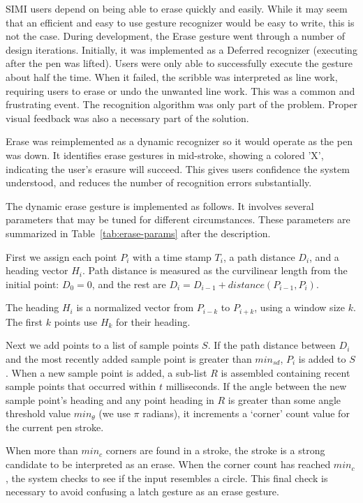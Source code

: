 

SIMI users depend on being able to erase quickly and easily. While it
may seem that an efficient and easy to use gesture recognizer would be
easy to write, this is not the case. During development, the Erase
gesture went through a number of design iterations. Initially, it was
implemented as a Deferred recognizer (executing after the pen was
lifted). Users were only able to successfully execute the gesture
about half the time. When it failed, the scribble was interpreted as
line work, requiring users to erase or undo the unwanted line work. This
was a common and frustrating event. The recognition algorithm was only
part of the problem. Proper visual feedback was also a necessary part
of the solution.

Erase was reimplemented as a dynamic recognizer so it would operate as
the pen was down. It identifies erase gestures in mid-stroke, showing
a colored 'X', indicating the user's erasure will succeed. This gives
users confidence the system understood, and reduces the number of
recognition errors substantially.

The dynamic erase gesture is implemented as follows. It involves
several parameters that may be tuned for different
circumstances. These parameters are summarized in
Table~\ref{tab:erase-params} after the description.

First we assign each point $P_i$ with a time stamp $T_i$, a path
distance $D_i$, and a heading vector $H_i$. Path distance is measured
as the curvilinear length from the initial point: $D_0=0$, and the
rest are $D_i = D_{i-1} + distance(P_{i-1}, P_i)$.

The heading $H_i$ is a normalized vector from $P_{i-k}$ to $P_{i+k}$,
using a window size $k$. The first $k$ points use $H_k$ for their
heading.

Next we add points to a list of sample points $S$. If the path
distance between $D_i$ and the most recently added sample point is
greater than $min_{sd}$, $P_i$ is added to $S$. When a new sample
point is added, a sub-list $R$ is assembled containing recent sample
points that occurred within $t$ milliseconds. If the angle between the
new sample point's heading and any point heading in $R$ is greater
than some angle threshold value $min_\theta$ (we use $\pi$ radians),
it increments a `corner' count value for the current pen stroke. 

When more than $min_c$ corners are found in a stroke, the stroke is a
strong candidate to be interpreted as an erase. When the corner count
has reached $min_c$, the system checks to see if the input resembles a
circle. This final check is necessary to avoid confusing a latch
gesture as an erase gesture.

